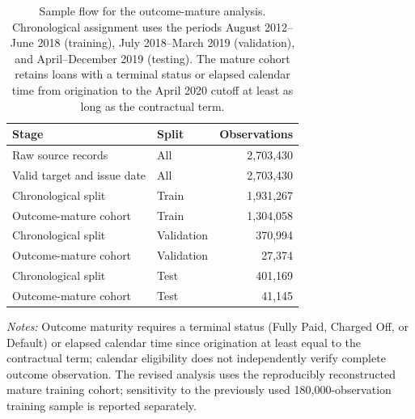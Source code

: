 \documentclass[10pt]{article}
\begin{document}
\begin{table}[!ht]
\centering
\caption{Sample flow for the outcome-mature analysis. Chronological assignment uses the periods August 2012--June 2018 (training), July 2018--March 2019 (validation), and April--December 2019 (testing). The mature cohort retains loans with a terminal status or elapsed calendar time from origination to the April 2020 cutoff at least as long as the contractual term.}
\label{tab:flow_mature}
\begin{tabular}{llr}
\toprule
Stage & Split & Observations \\
\midrule
Raw source records & All & 2,703,430 \\
Valid target and issue date & All & 2,703,430 \\
\midrule
Chronological split & Train & 1,931,267 \\
Outcome-mature cohort & Train & 1,304,058 \\
Chronological split & Validation & 370,994 \\
Outcome-mature cohort & Validation & 27,374 \\
Chronological split & Test & 401,169 \\
Outcome-mature cohort & Test & 41,145 \\
\bottomrule
\end{tabular}

\vspace{3pt}
{\footnotesize \textit{Notes:} Outcome maturity requires a terminal status (Fully Paid, Charged Off, or Default) or elapsed calendar time since origination at least equal to the contractual term; calendar eligibility does not independently verify complete outcome observation. The revised analysis uses the reproducibly reconstructed mature training cohort; sensitivity to the previously used 180,000-observation training sample is reported separately.}
\end{table}
\end{document}
